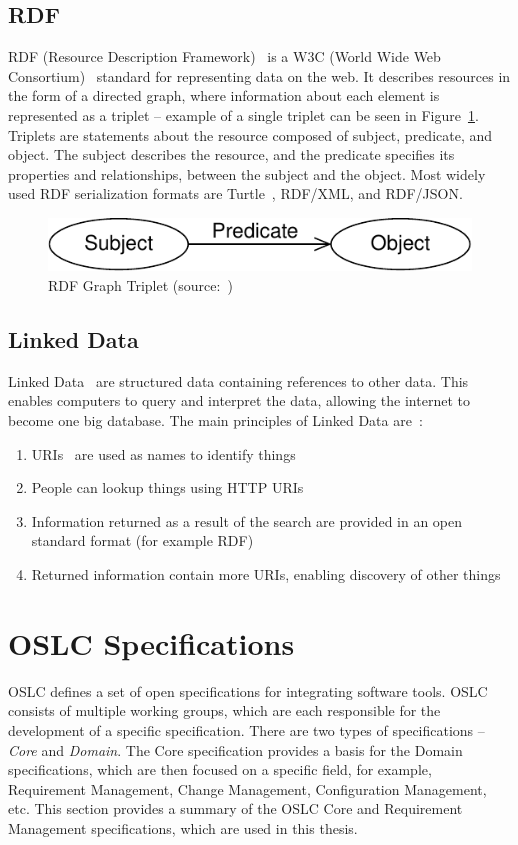 \subsection*{RDF}
RDF (Resource Description Framework) \cite{rdf} is a W3C (World Wide Web Consortium) \cite{w3c} standard for representing data on the web. It describes resources in the form of a directed graph, where information about each element is represented as a triplet -- example of a single triplet can be seen in Figure \ref{fig:rdf_graph_triplet}. Triplets are statements about the resource composed of subject, predicate, and object. The subject describes the resource, and the predicate specifies its properties and relationships, between the subject and the object. Most widely used RDF serialization formats are Turtle \cite{turtle}, RDF/XML, and RDF/JSON.

\begin{figure}[hbt]
  \centering
  \includegraphics[width=.6 \linewidth]{figures/rdf-graph.pdf}
  \caption{RDF Graph Triplet (source: \cite{rdf_primer})}
  \label{fig:rdf_graph_triplet}
\end{figure}

\subsection*{Linked Data}
Linked Data \cite{linked_data} are structured data containing references to other data. This enables computers to query and interpret the data, allowing the internet to become one big database. The main principles of Linked Data are \cite{linked_data_design_issues}:
\begin{enumerate}
  \item URIs \cite{uri_rfc} are used as names to identify things
  \item People can lookup things using HTTP URIs
  \item Information returned as a result of the search are provided in an open standard format (for example RDF)
  \item Returned information contain more URIs, enabling discovery of other things
\end{enumerate}

\section{OSLC Specifications}
OSLC defines a set of open specifications for integrating software tools. OSLC consists of multiple working groups, which are each responsible for the development of a specific specification. There are two types of specifications -- \emph{Core} and \emph{Domain}. The Core specification provides a basis for the Domain specifications, which are then focused on a specific field, for example, Requirement Management, Change Management, Configuration Management, etc. This section provides a summary of the OSLC Core and Requirement Management specifications, which are used in this thesis.

